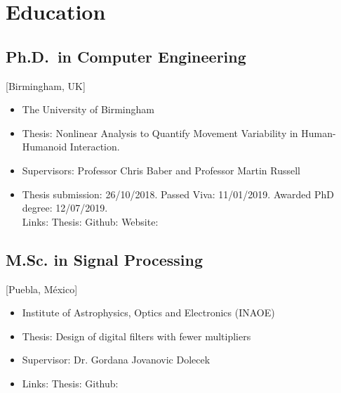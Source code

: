 \documentclass{mycv}
\begin{document}
\maketitle


\section{Education}
\subsection{Ph.D.\ in Computer Engineering}[Birmingham, UK]
\begin{itemize}[label={}]
  \item The University of Birmingham 
  \item Thesis: Nonlinear Analysis to Quantify Movement Variability in Human-Humanoid Interaction.   
  \item Supervisors: Professor Chris Baber and  Professor Martin Russell
  \item	Thesis submission: 26/10/2018. Passed Viva: 11/01/2019. Awarded PhD degree: 12/07/2019. \\
	Links: Thesis: \href{https://doi.org/10.5281/zenodo.3384145}{\faFilePdf}
	Github: \href{http://doi.org/10.5281/zenodo.3384281}{\faGithub*}
	Website: \href{https://mxochicale-phd.github.io/site/}{\faExternalLink*} 
\end{itemize}

\subsection{M.Sc. in Signal Processing}[Puebla, M\'exico]
\begin{itemize}[label={}]
  \item Institute of Astrophysics, Optics and Electronics (INAOE) 
  \item Thesis: Design of digital filters with fewer multipliers
  \item Supervisor: Dr. Gordana Jovanovic Dolecek
  \item	Links: 
	Thesis: \href{https://github.com/mxochicale/publications/blob/master/thesis/M.Sc./doc/MPXochicale_MScThesis-2016.pdf}{\faFilePdf}
	Github: \href{https://github.com/mxochicale/publications/tree/master/thesis/M.Sc.}{\faGithub*}
\end{itemize}
\end{document}
